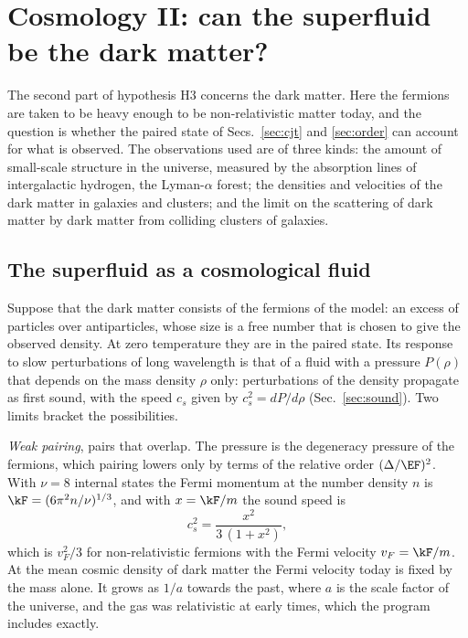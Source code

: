 
\section{Cosmology II: can the superfluid be the dark matter?}
\label{sec:dm}

The second part of hypothesis H3 concerns the dark matter. Here the fermions are taken to be heavy
enough to be non-relativistic matter today, and the question is whether the paired state of
Secs.~\ref{sec:cjt} and \ref{sec:order} can account for what is observed. The observations used are
of three kinds: the amount of small-scale structure in the universe, measured by the absorption
lines of intergalactic hydrogen, the Lyman-$\alpha$ forest; the densities and velocities of the dark
matter in galaxies and clusters; and the limit on the scattering of dark matter by dark matter from
colliding clusters of galaxies.

\subsection{The superfluid as a cosmological fluid}
\label{sec:sffluid}

Suppose that the dark matter consists of the fermions of the model: an excess of particles over
antiparticles, whose size is a free number that is chosen to give the observed density. At zero
temperature they are in the paired state. Its response to slow perturbations of long wavelength is
that of a fluid with a pressure $P(\rho)$ that depends on the mass density $\rho$ only: perturbations
of the density propagate as first sound, with the speed $c_s$ given by $c_s^2=dP/d\rho$
(Sec.~\ref{sec:sound}). Two limits bracket the possibilities.

\emph{Weak pairing}, pairs that overlap. The pressure is the degeneracy pressure of the fermions,
which pairing lowers only by terms of the relative order $(\Delta/\EF)^2$. With $\nu=8$ internal
states the Fermi momentum at the number density $n$ is $\kF=(6\pi^2n/\nu)^{1/3}$, and with
$x=\kF/m$ the sound speed is
\begin{equation}
c_s^2=\frac{x^2}{3\,(1+x^2)},
\label{eq:csdeg}
\end{equation}
which is $v_F^2/3$ for non-relativistic fermions with the Fermi velocity $v_F=\kF/m$. At the mean
cosmic density of dark matter the Fermi velocity today is fixed by the mass alone. It grows as $1/a$
towards the past, where $a$ is the scale factor of the universe, and the gas was relativistic at
early times, which the program includes exactly.

